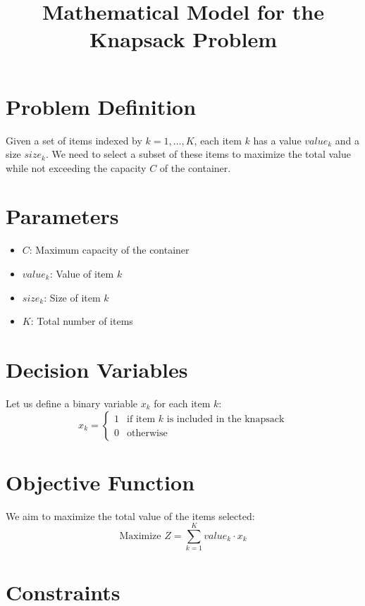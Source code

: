 \documentclass{article}
\begin{document}
\title{Mathematical Model for the Knapsack Problem}
\author{}
\date{}
\maketitle

\section*{Problem Definition}

Given a set of items indexed by $k = 1, \ldots, K$, each item $k$ has a value $value_k$ and a size $size_k$. We need to select a subset of these items to maximize the total value while not exceeding the capacity $C$ of the container.

\section*{Parameters}

\begin{itemize}
    \item $C$: Maximum capacity of the container
    \item $value_k$: Value of item $k$
    \item $size_k$: Size of item $k$
    \item $K$: Total number of items
\end{itemize}

\section*{Decision Variables}

Let us define a binary variable $x_k$ for each item $k$:
\[
x_k =
\begin{cases}
1 & \text{if item } k \text{ is included in the knapsack} \\
0 & \text{otherwise}
\end{cases}
\]

\section*{Objective Function}

We aim to maximize the total value of the items selected:
\[
\text{Maximize } Z = \sum_{k=1}^{K} value_k \cdot x_k
\]

\section*{Constraints}
\end{document}
